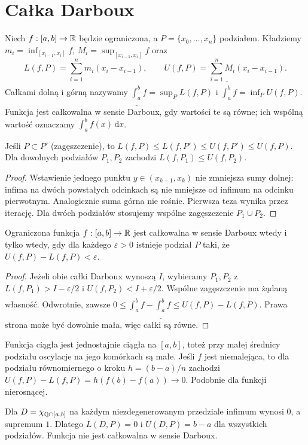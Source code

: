 \section{Całka Darboux}
\begin{definicja}
Niech $f:[a,b]\to\mathbb R$ będzie ograniczona, a $P=\{x_0,\dots,x_n\}$ podziałem. Kładziemy $m_i=\inf_{[x_{i-1},x_i]}f$, $M_i=\sup_{[x_{i-1},x_i]}f$ oraz
\[
L(f,P)=\sum_{i=1}^n m_i(x_i-x_{i-1}),\qquad
U(f,P)=\sum_{i=1}^n M_i(x_i-x_{i-1}).
\]
Całkami dolną i górną nazywamy $\underline{\int_a^b}f=\sup_P L(f,P)$ i $\overline{\int_a^b}f=\inf_P U(f,P)$. Funkcja jest całkowalna w sensie Darboux, gdy wartości te są równe; ich wspólną wartość oznaczamy $\int_a^b f(x)\,\mathrm dx$.
\end{definicja}
\begin{lemat}
Jeśli $P\subset P'$ (zagęszczenie), to $L(f,P)\le L(f,P')\le U(f,P')\le U(f,P)$. Dla dowolnych podziałów $P_1,P_2$ zachodzi $L(f,P_1)\le U(f,P_2)$.
\end{lemat}
\begin{proof}
Wstawienie jednego punktu $y\in(x_{k-1},x_k)$ nie zmniejsza sumy dolnej: infima na dwóch powstałych odcinkach są nie mniejsze od infimum na odcinku pierwotnym. Analogicznie suma górna nie rośnie. Pierwsza teza wynika przez iterację. Dla dwóch podziałów stosujemy wspólne zagęszczenie $P_1\cup P_2$.
\end{proof}
\begin{twierdzenie}
Ograniczona funkcja $f:[a,b]\to\mathbb R$ jest całkowalna w sensie Darboux wtedy i tylko wtedy, gdy dla każdego $\varepsilon>0$ istnieje podział $P$ taki, że $U(f,P)-L(f,P)<\varepsilon$.
\end{twierdzenie}
\begin{proof}
Jeżeli obie całki Darboux wynoszą $I$, wybieramy $P_1,P_2$ z $L(f,P_1)>I-\varepsilon/2$ i $U(f,P_2)<I+\varepsilon/2$. Wspólne zagęszczenie ma żądaną własność. Odwrotnie, zawsze $0\le\overline{\int_a^b}f-\underline{\int_a^b}f\le U(f,P)-L(f,P)$. Prawa strona może być dowolnie mała, więc całki są równe.
\end{proof}
\begin{przyklad}
Funkcja ciągła jest jednostajnie ciągła na $[a,b]$, toteż przy małej średnicy podziału oscylacje na jego komórkach są małe. Jeśli $f$ jest niemalejąca, to dla podziału równomiernego o kroku $h=(b-a)/n$ zachodzi $U(f,P)-L(f,P)=h(f(b)-f(a))\to0$. Podobnie dla funkcji nierosnącej.
\end{przyklad}
\begin{przyklad}
Dla $D=\chi_{\mathbb Q\cap[a,b]}$ na każdym niezdegenerowanym przedziale infimum wynosi $0$, a supremum $1$. Dlatego $L(D,P)=0$ i $U(D,P)=b-a$ dla wszystkich podziałów. Funkcja nie jest całkowalna w sensie Darboux.
\end{przyklad}
